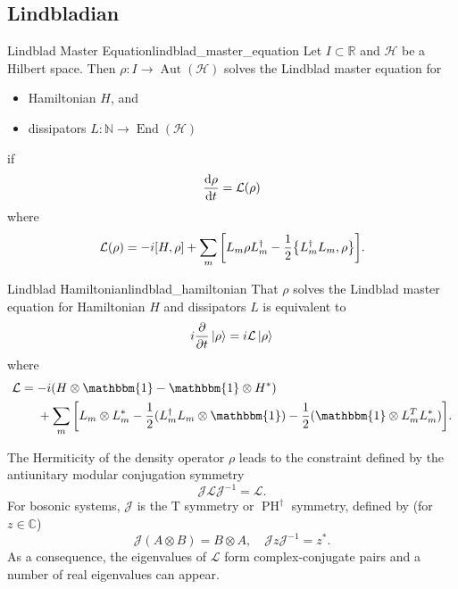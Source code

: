 \documentclass{article}
\begin{document}
\subsection{Lindbladian}

\begin{definition}{Lindblad Master Equation}{lindblad_master_equation}
    Let $I\subset \mathbb{R}$ and $\mathcal{H}$ be a Hilbert space.
    Then $\rho: I\rightarrow \operatorname{Aut}(\mathcal{H})$ solves the Lindblad master equation for
    \begin{itemize}
        \item Hamiltonian $H$, and
        \item dissipators $L: \mathbb{N}\rightarrow \operatorname{End}(\mathcal{H})$
    \end{itemize}
    if
    \[ \dv{\rho}{t} = \mathcal{L}(\rho) \]
    where
    \[ \mathcal{L}(\rho) = -i [H,\rho] + \sum_m \qty[L_m \rho L^\dagger_m - \frac{1}{2} \qty{L^\dagger_m L_m,\rho}]. \]
\end{definition}

\begin{theorem}{Lindblad Hamiltonian}{lindblad_hamiltonian}
    That $\rho$ solves the Lindblad master equation for Hamiltonian $H$ and dissipators $L$ is equivalent to
    \[ i\pdv{t} \ket{\rho} = i\mathcal{L}\ket{\rho} \]
    where
    \begin{align*}
        \mathcal{L} &= -i(H\otimes \mathbbm{1} - \mathbbm{1}\otimes H^*) \\
        &\phantom{{}={}} + \sum_m \qty[L_m\otimes L^*_m - \frac{1}{2}(L^\dagger_m L_m \otimes \mathbbm{1}) - \frac{1}{2}(\mathbbm{1} \otimes L^T_m L^*_m)].
    \end{align*}
\end{theorem}

The Hermiticity of the density operator $\rho$ leads to the constraint defined by the antiunitary modular conjugation symmetry
\[ \mathcal{J} \mathcal{L} \mathcal{J}^{-1} = \mathcal{L}. \]
For bosonic systems, $\mathcal{J}$ is the $\mathrm{T}$ symmetry or $\operatorname{PH}^\dagger$ symmetry, defined by (for $z\in \mathbb{C}$)
\[ \mathcal{J}(A\otimes B) = B\otimes A, \quad \mathcal{J} z \mathcal{J}^{-1} = z^*. \]
As a consequence, the eigenvalues of $\mathcal{L}$ form complex-conjugate pairs and a number of real eigenvalues can appear.

% 
% 
\end{document}
